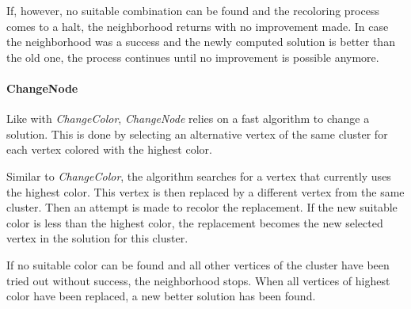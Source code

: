 \documentclass[paper = a4, fontsize = 10pt]{scrartcl}
\begin{document}
If, however, no suitable combination can be found and the recoloring process comes to a halt, the neighborhood returns with no improvement made. In case the neighborhood was a success and the newly computed solution is better than the old one, the process continues until no improvement is possible anymore.



\paragraph{ChangeNode}
Like with \emph{ChangeColor}, \emph{ChangeNode} relies on a fast algorithm to change a solution. This is done by selecting an alternative vertex of the same cluster for each vertex colored with the highest color.


Similar to \emph{ChangeColor}, the algorithm searches for a vertex that currently uses the highest color. This vertex is then replaced by a different vertex from the same cluster. Then an attempt is made to recolor the replacement. If the new suitable color is less than the highest color, the replacement becomes the new selected vertex in the solution for this cluster.


If no suitable color can be found and all other vertices of the cluster have been tried out without success, the neighborhood stops. When all vertices of highest color have been replaced, a new better solution has been found.
\end{document}
